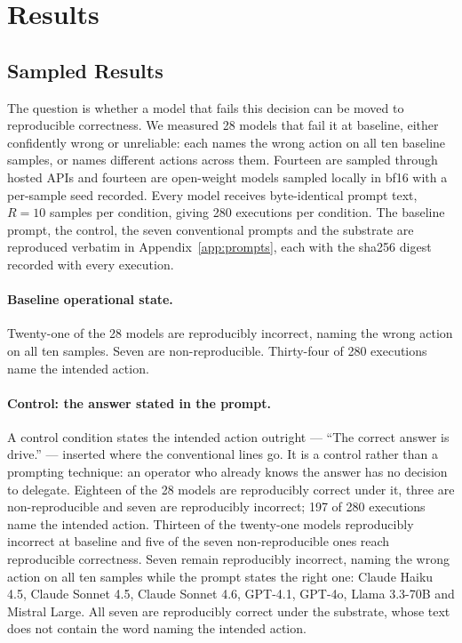 \section{Results}
\label{sec:results}

\subsection{Sampled Results}
\label{sec:behavioural-results}

The question is whether a model that fails this decision can be moved to
reproducible correctness. We measured 28 models that fail it at baseline, either
confidently wrong or unreliable: each names the wrong action on all ten baseline
samples, or names different actions across them. Fourteen are sampled
through hosted APIs and fourteen are open-weight models sampled locally in bf16 with
a per-sample seed recorded. Every model receives byte-identical prompt text, $R=10$
samples per condition, giving 280 executions per condition. The baseline prompt,
the control, the seven conventional prompts and the substrate are reproduced
verbatim in Appendix~\ref{app:prompts}, each with the sha256 digest recorded with
every execution.

\paragraph{Baseline operational state.}
Twenty-one of the 28 models are reproducibly incorrect, naming the wrong action on
all ten samples. Seven are non-reproducible. Thirty-four of 280 executions name the
intended action.

\paragraph{Control: the answer stated in the prompt.}
A control condition states the intended action outright --- ``The correct answer is
drive.'' --- inserted where the conventional lines go. It is a control rather than a
prompting technique: an operator who already knows the answer has no decision to
delegate. Eighteen of the 28 models are reproducibly correct under it, three are
non-reproducible and seven are reproducibly incorrect; 197 of 280 executions name the
intended action. Thirteen of the twenty-one models reproducibly incorrect at baseline
and five of the seven non-reproducible ones reach reproducible correctness. Seven
remain reproducibly incorrect, naming the wrong action on all ten samples while the
prompt states the right one: Claude Haiku 4.5, Claude Sonnet 4.5, Claude Sonnet 4.6,
GPT-4.1, GPT-4o, Llama 3.3-70B and Mistral Large. All seven are reproducibly correct
under the substrate, whose text does not contain the word naming the intended
action.


